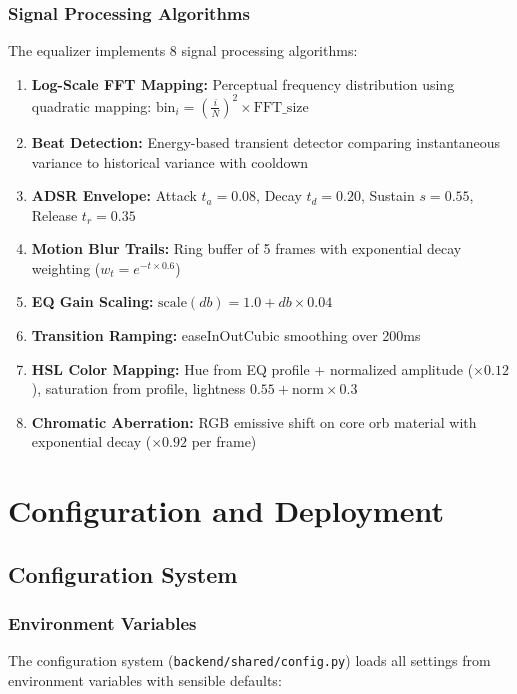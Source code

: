\documentclass[12pt,a4paper,twoside]{report}
\begin{document}
\subsection{Signal Processing Algorithms}

The equalizer implements 8 signal processing algorithms:

\begin{enumerate}[leftmargin=*]
    \item \textbf{Log-Scale FFT Mapping:} Perceptual frequency distribution using quadratic mapping: $\text{bin}_i = (\frac{i}{N})^2 \times \text{FFT\_size}$
    \item \textbf{Beat Detection:} Energy-based transient detector comparing instantaneous variance to historical variance with cooldown
    \item \textbf{ADSR Envelope:} Attack $t_a=0.08$, Decay $t_d=0.20$, Sustain $s=0.55$, Release $t_r=0.35$
    \item \textbf{Motion Blur Trails:} Ring buffer of 5 frames with exponential decay weighting ($w_t = e^{-t \times 0.6}$)
    \item \textbf{EQ Gain Scaling:} $\text{scale}(db) = 1.0 + db \times 0.04$
    \item \textbf{Transition Ramping:} easeInOutCubic smoothing over 200ms
    \item \textbf{HSL Color Mapping:} Hue from EQ profile + normalized amplitude ($\times 0.12$), saturation from profile, lightness $0.55 + \text{norm} \times 0.3$
    \item \textbf{Chromatic Aberration:} RGB emissive shift on core orb material with exponential decay ($\times 0.92$ per frame)
\end{enumerate}

\chapter{Configuration and Deployment}

\section{Configuration System}

\subsection{Environment Variables}

The configuration system (\texttt{backend/shared/config.py}) loads all settings from environment variables with sensible defaults:
\end{document}
